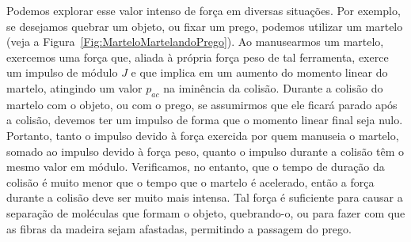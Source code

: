 Podemos explorar esse valor intenso de força em diversas situações. Por exemplo, se desejamos quebrar um objeto, ou fixar um prego, podemos utilizar um martelo (veja a Figura~\ref{Fig:MarteloMartelandoPrego}). Ao manusearmos um martelo, exercemos uma força que, aliada à própria força peso de tal ferramenta, exerce um impulso de módulo $J$ e que implica em um aumento do momento linear do martelo, atingindo um valor $p_{ac}$ na iminência da colisão. Durante a colisão do martelo com o objeto, ou com o prego, se assumirmos que ele ficará parado após a colisão, devemos ter um impulso de forma que o momento linear final seja nulo. Portanto, tanto o impulso devido à força exercida por quem manuseia o martelo, somado ao impulso devido à força peso, quanto o impulso durante a colisão têm o mesmo valor em módulo. Verificamos, no entanto, que o tempo de duração da colisão é muito menor que o tempo que o martelo é acelerado, então a força durante a colisão deve ser muito mais intensa. Tal força é suficiente para causar a separação de moléculas que formam o objeto, quebrando-o, ou para fazer com que as fibras da madeira sejam afastadas, permitindo a passagem do prego.

